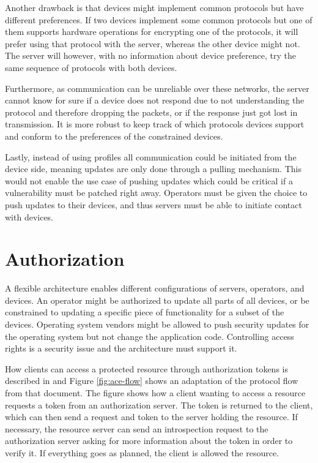 \documentclass[0-thesis.tex]{subfiles}
\begin{document}
Another drawback is that devices might implement common protocols but have different
preferences. If two devices implement some common protocols but one of them supports
hardware operations for encrypting one of the protocols, it will prefer using that
protocol with the server, whereas the other device might not. The server will however,
with no information about device preference, try the same sequence of protocols with both
devices.

Furthermore, as communication can be unreliable over these networks, the server
cannot know for sure if a device does not respond due to not understanding the protocol
and therefore dropping the packets, or if the response just got lost in transmission. It
is more robust to keep track of which protocols devices support and conform to the
preferences of the constrained devices.

Lastly, instead of using profiles all communication could be initiated from the device
side, meaning updates are only done through a pulling mechanism. This would not enable the
use case of pushing updates which could be critical if a vulnerability must be patched
right away. Operators must be given the choice to push updates to their devices, and thus
servers must be able to initiate contact with devices.

\section{Authorization}
\label{sec:authorization}
A flexible architecture enables different configurations of servers, operators, and
devices. An operator might be authorized to update all parts of all devices, or be
constrained to updating a specific piece of functionality for a subset of the devices.
Operating system vendors might be allowed to push security updates for the operating
system but not change the application code. Controlling access rights is a security issue
and the architecture must support it.

How clients can access a protected resource through authorization tokens is described in
\parencite{ace} and Figure \ref{fig:ace-flow} shows an adaptation of the protocol flow
from that document. The figure shows how a client wanting to access a resource requests a
token from an authorization server. The token is returned to the client, which can then
send a request and token to the server holding the resource. If necessary, the resource
server can send an introspection request to the authorization server asking for more
information about the token in order to verify it. If everything goes as planned, the
client is allowed the resource.
\end{document}
